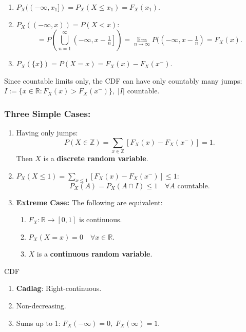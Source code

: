 \begin{eg}{}
\begin{enumerate}
    \item \( P_X((-\infty, x_1]) = P_X(X \leq x_1) = F_X(x_1) \).
    \item \( P_X((-\infty, x)) = P(X < x) \):
    \[
    = P\left( \bigcup_{n=1}^\infty \left(-\infty, x - \tfrac{1}{n}\right] \right) = \lim_{n \to \infty} P((-\infty, x - \tfrac{1}{n}) = F_X(x).
    \]
    \item \( P_X(\{x\}) = P(X = x) = F_X(x) - F_X(x^{-}) \).
\end{enumerate}	
\end{eg}
\noindent Since countable limits only, the CDF can have only countably many jumps: \( I := \{x \in \mathbb{R}: F_X(x) > F_X(x^{-})\}, \; |I| \) countable.
\subsubsection*{Three Simple Cases:}
\begin{enumerate}
    \item Having only jumps:
    \[
    P(X \in \mathbb{Z}) = \sum_{x \in \mathbb{Z}} [F_X(x) - F_X(x^-)] = 1.
    \]
    Then \( X \) is a \textbf{discrete random variable}.
    \item \( P_X(X \leq 1) = \sum_{x \leq 1} [F_X(x) - F_X(x^-)] \leq 1 \):
    \[
    P_X(A) = P_X(A \cap I) \leq 1 \quad \forall A \text{ countable}.
    \]
    \item \textbf{Extreme Case:} The following are equivalent:
    \begin{enumerate}
        \item \( F_X: \mathbb{R} \to [0, 1] \) is continuous.
        \item \( P_X(X = x) = 0 \quad \forall x \in \mathbb{R} \).
        \item \( X \) is a \textbf{continuous random variable}.
    \end{enumerate}
\end{enumerate}


\begin{prop}{CDF}
\begin{enumerate}
    \item \textbf{Cadlag}: Right-continuous.
    \item Non-decreasing.
    \item Sums up to 1: \( F_X(-\infty) = 0, \; F_X(\infty) = 1 \).
\end{enumerate}	
\end{prop}

